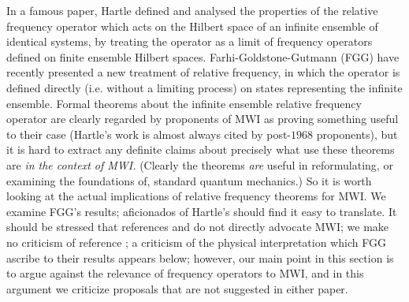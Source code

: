 \documentclass[aps,pra,12pt]{revtex4}
\begin{document}
In a famous paper, Hartle defined and analysed the properties of
the relative frequency operator which acts on the Hilbert space of an infinite
ensemble of identical systems, by treating the operator as a limit of 
frequency operators defined on finite ensemble Hilbert spaces.  
Farhi-Goldstone-Gutmann (FGG) 
have recently presented a new treatment of relative
frequency, in which the operator is defined directly (i.e. without a 
limiting process) on states representing the infinite ensemble.   
Formal theorems about the infinite ensemble relative frequency operator 
are clearly regarded by proponents of MWI
as proving something useful to their case (Hartle's work is almost always
cited by post-$1968$ proponents), but it is hard to extract any definite
claims about precisely what use these theorems are 
{\em in the context of MWI.} (Clearly the theorems {\em are} useful in 
reformulating, or examining the foundations of, standard quantum mechanics.)
So it is worth looking at the actual implications of relative frequency
theorems for MWI. 
We examine FGG's results; aficionados of Hartle's should find it
easy to translate.
It should be stressed that references \cite{har} and \cite{fgg} do not 
directly advocate MWI; we make no criticism of reference \cite{har};
a criticism of the physical interpretation which FGG ascribe to their
results appears below; however, our main point in this section is to
argue against the relevance of frequency operators to MWI, and in this
argument we criticize proposals that are not suggested in either
paper.
\end{document}
